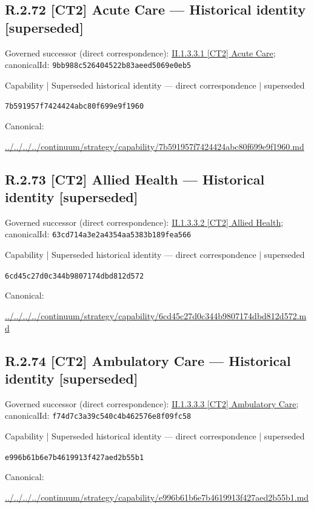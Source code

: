 \documentclass[10pt,a4paper]{article}
\begin{document}
\subsection*{R.2.72 [CT2] Acute Care — Historical identity [superseded]}
Governed successor (direct correspondence): \hyperref[element-9bb988c526404522b83aeed5069e0eb5]{II.1.3.3.1 [CT2] Acute Care}; canonicalId: \texttt{9bb988c526404522b83aeed5069e0eb5}\par
\label{element-7b591957f7424424abc80f699e9f1960}
{\small Capability | Superseded historical identity — direct correspondence | superseded}\par
\texttt{7b591957f7424424abc80f699e9f1960}\par
Canonical: \par
{\footnotesize\url{../../../../continuum/strategy/capability/7b591957f7424424abc80f699e9f1960.md}}\par
\subsection*{R.2.73 [CT2] Allied Health — Historical identity [superseded]}
Governed successor (direct correspondence): \hyperref[element-63cd714a3e2a4354aa5383b189fea566]{II.1.3.3.2 [CT2] Allied Health}; canonicalId: \texttt{63cd714a3e2a4354aa5383b189fea566}\par
\label{element-6cd45c27d0c344b9807174dbd812d572}
{\small Capability | Superseded historical identity — direct correspondence | superseded}\par
\texttt{6cd45c27d0c344b9807174dbd812d572}\par
Canonical: \par
{\footnotesize\url{../../../../continuum/strategy/capability/6cd45c27d0c344b9807174dbd812d572.md}}\par
\subsection*{R.2.74 [CT2] Ambulatory Care — Historical identity [superseded]}
Governed successor (direct correspondence): \hyperref[element-f74d7c3a39c540c4b462576e8f09fc58]{II.1.3.3.3 [CT2] Ambulatory Care}; canonicalId: \texttt{f74d7c3a39c540c4b462576e8f09fc58}\par
\label{element-e996b61b6e7b4619913f427aed2b55b1}
{\small Capability | Superseded historical identity — direct correspondence | superseded}\par
\texttt{e996b61b6e7b4619913f427aed2b55b1}\par
Canonical: \par
{\footnotesize\url{../../../../continuum/strategy/capability/e996b61b6e7b4619913f427aed2b55b1.md}}\par
\end{document}
